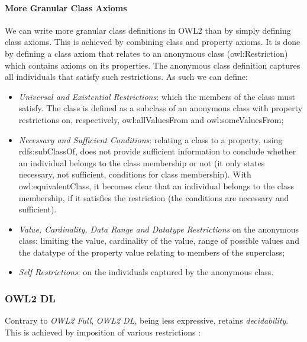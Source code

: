 \paragraph{More Granular Class Axioms} We can write more granular class definitions in \gls{OWL2} than by simply defining class axioms. This is achieved by combining class and property axioms. It is done by defining a class axiom that relates to an anonymous class (owl:Restriction) which contains axioms on its properties. The anonymous class definition captures all individuals that satisfy such restrictions. As such we can define:
\begin{itemize}
    \item \emph{Universal and Existential Restrictions}: which the members of the class must satisfy. The class is defined as a subclass of an anonymous class with property restrictions on, respectively, owl:allValuesFrom and owl:someValuesFrom;      
    \item \emph{Necessary and Sufficient Conditions}: relating a class to a property, using rdfs:subClass\-Of, does not provide sufficient information to conclude whether an individual belongs to the class membership or not (it only states necessary, not sufficient, conditions for class membership). With owl:equivalentClass, it becomes clear that an individual belongs to the class membership, if it satisfies the restriction (the conditions are necessary and sufficient).
    \item \emph{Value, Cardinality, Data Range and Datatype Restrictions} on the anonymous class: limiting the value, cardinality of the value, range of possible values and the datatype of the property value relating to members of the superclass; 
    \item \emph{Self Restrictions}: on the individuals captured by the anonymous class.

\end{itemize}

\subsubsection{OWL2 DL}

Contrary to \emph{OWL2 Full}, \emph{OWL2 DL}, being less expressive, retains \emph{decidability}. This is achieved by imposition of various restrictions \autocite{Antoniou2012-nj}: 

